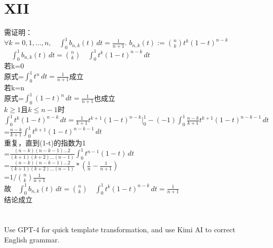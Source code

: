 \documentclass[a4paper]{article}
\begin{document}
\section*{XII}
需证明：\\
$\forall k = 0, 1, \ldots, n, \quad \int_{0}^{1} b_{n,k}(t) \, dt = \frac{1}{n+1}.$
$b_{n,k}(t) := \binom{n}{k} t^k (1-t)^{n-k}$\\
$\quad \int_{0}^{1} b_{n,k}(t) \, dt=\binom{n}{k}\quad \int_{0}^{1}t^k (1-t)^{n-k}\, dt$\\
若k=0\\
原式=$\int_{0}^{1}t^{n}\, dt=\frac{1}{n+1}$成立\\
若k=n\\
原式=$\int_{0}^{1}(1-t)^{n}\, dt=\frac{1}{n+1}$也成立\\
$k\geq1$且$k\leq n-1$时\\
$\int_{0}^{1}t^k (1-t)^{n-k}\, dt=\frac{1}{k+1}t^{k+1} (1-t)^{n-k}|_{0}^1-(-1)\int_{0}^{1}\frac{n-k}{k+1}t^{k+1}(1-t)^{n-k-1}\, dt$\\
=$\frac{n-k}{k+1}\int_{0}^{1}t^{k+1}(1-t)^{n-k-1}\, dt$\\
重复，直到(1-t)的指数为1\\
=$\frac{(n-k)(n-k-1)...2}{(k+1)(k+2)...(n-1)}\int_{0}^{1}t^{n-1}(1-t)\, dt$\\
=$\frac{(n-k)(n-k-1)...2}{(k+1)(k+2)...(n-1)}*(\frac{1}{n}-\frac{1}{n+1})$\\
=$1/\binom{n}{k}\frac{1}{n+1}$\\
故$\quad \int_{0}^{1} b_{n,k}(t) \, dt=\binom{n}{k}\quad \int_{0}^{1}t^k (1-t)^{n-k}\, dt=\frac{1}{n+1}$\\
结论成立\\


\section*{  }
Use GPT-4 for quick template transformation, and use Kimi AI to correct English grammar.
\end{document}
